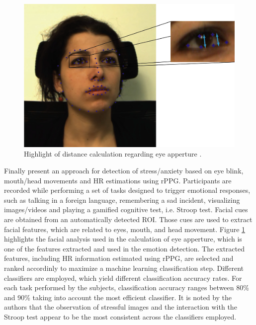 \begin{figure}[h]
    \centering
    \includegraphics[width=\linewidth]{figures/giannakakis2017stress-eye.png}
    \caption{Highlight of distance calculation regarding eye apperture \parencite{giannakakis2017stress}.}
    \label{fig:distance-samara}
\end{figure}

Finally \textcite{giannakakis2017stress} present an approach for detection of stress/anxiety based on eye blink, mouth/head movements and HR estimations using rPPG. Participants are recorded while performing a set of tasks designed to trigger emotional responses, such as talking in a foreign language, remembering a sad incident, visualizing images/videos and playing a gamified cognitive test, i.e. Stroop test. Facial cues are obtained from an automatically detected ROI. Those cues are used to extract facial features, which are related to eyes, mouth, and head movement. Figure \ref{fig:distance-samara} highlights the facial analysis used in the calculation of eye apperture, which is one of the features extracted and used in the emotion detection. The extracted features, including HR information estimated using rPPG, are selected and ranked accordinly to maximize a machine learning classification step. Different classifiers are employed, which yield different classification accuracy rates. For each task performed by the subjects, classification accuracy ranges between 80\% and 90\% taking into account the most efficient classifier. It is noted by the authors that the observation of stressful images and the interaction with the Stroop test appear to be the most consistent across the classifiers employed.
